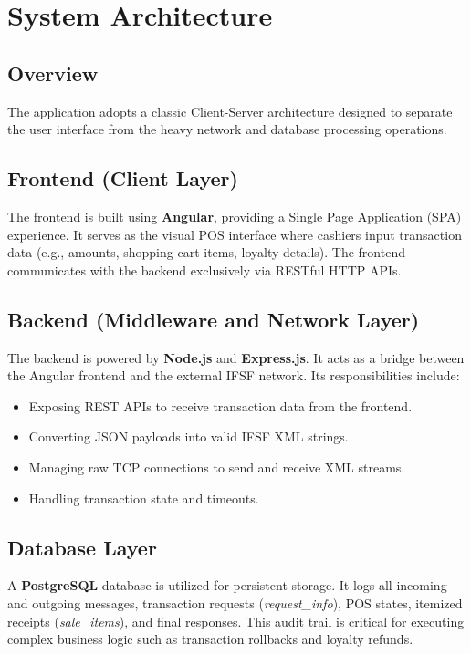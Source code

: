 \documentclass[12pt,a4paper]{report}
\begin{document}
\chapter{System Architecture}
\section{Overview}
The application adopts a classic Client-Server architecture designed to separate the user interface from the heavy network and database processing operations.

\section{Frontend (Client Layer)}
The frontend is built using \textbf{Angular}, providing a Single Page Application (SPA) experience. It serves as the visual POS interface where cashiers input transaction data (e.g., amounts, shopping cart items, loyalty details). The frontend communicates with the backend exclusively via RESTful HTTP APIs.

\section{Backend (Middleware and Network Layer)}
The backend is powered by \textbf{Node.js} and \textbf{Express.js}. It acts as a bridge between the Angular frontend and the external IFSF network. Its responsibilities include:
\begin{itemize}
    \item Exposing REST APIs to receive transaction data from the frontend.
    \item Converting JSON payloads into valid IFSF XML strings.
    \item Managing raw TCP connections to send and receive XML streams.
    \item Handling transaction state and timeouts.
\end{itemize}

\section{Database Layer}
A \textbf{PostgreSQL} database is utilized for persistent storage. It logs all incoming and outgoing messages, transaction requests (\textit{request\_info}), POS states, itemized receipts (\textit{sale\_items}), and final responses. This audit trail is critical for executing complex business logic such as transaction rollbacks and loyalty refunds.
\end{document}
